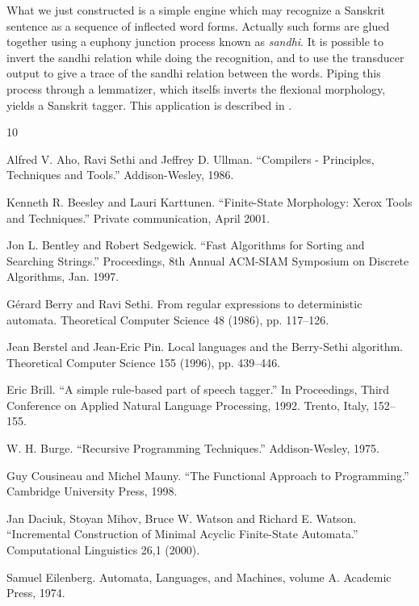 \documentclass[12pt]{article}
\begin{document}
What we just constructed is a simple engine which may recognize a Sanskrit sentence 
as a sequence of inflected word forms. Actually such forms are glued together 
using a euphony junction
process known as {\sl sandhi}. It is possible to invert the sandhi relation while doing
the recognition, and to use the transducer output to give a trace of the sandhi relation
between the words. Piping this process through a lemmatizer, which itselfs inverts the
flexional morphology, yields a Sanskrit tagger. This application is described in
\cite{2004-Huet-1}. 


\begin{thebibliography}{10}

 Alfred V. Aho, Ravi Sethi and Jeffrey D. Ullman.
``Compilers - Principles, Techniques and Tools.'' Addison-Wesley, 1986.

 Kenneth R. Beesley and Lauri Karttunen. ``Finite-State 
Morphology: Xerox Tools and Techniques.'' Private communication, April 2001.

 Jon L. Bentley and Robert Sedgewick.
``Fast Algorithms for Sorting and Searching Strings.'' 
Proceedings, 8th Annual ACM-SIAM Symposium on Discrete Algorithms, Jan. 1997.

G\'erard Berry and Ravi Sethi.
From regular expressions to deterministic automata.
Theoretical Computer Science 48 (1986), pp. 117--126.

Jean Berstel and Jean-Eric Pin. Local languages and the {Berry}-{Sethi} algorithm.
Theoretical Computer Science 155 (1996), pp. 439--446.

 Eric Brill. ``A simple rule-based part of speech tagger.''
In Proceedings, Third Conference on Applied Natural Language Processing, 1992.
Trento, Italy, 152--155. 

 W. H. Burge. ``Recursive Programming Techniques.''
Addison-Wesley, 1975. 

 Guy Cousineau and Michel Mauny. ``The Functional Approach to
Programming.'' Cambridge University Press, 1998.

 Jan Daciuk, Stoyan Mihov, Bruce W. Watson and Richard E. 
Watson. ``Incremental Construction of Minimal Acyclic Finite-State Automata.''
Computational Linguistics 26,1 (2000). 

Samuel Eilenberg. Automata, Languages, and Machines, volume A.
Academic Press, 1974.


\end{thebibliography}
\end{document}
